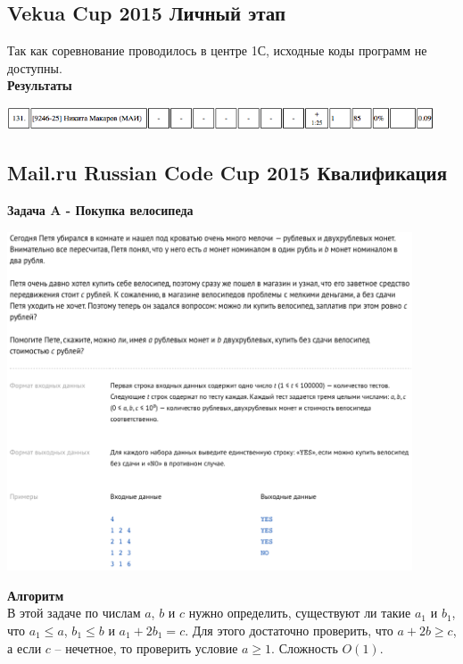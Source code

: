 \documentclass[a4paper,12pt]{article}
\begin{document}
%
%
\newpage
\subsection{Vekua Cup 2015 Личный этап}

Так как соревнование проводилось в центре 1С, исходные коды программ не доступны. \\

\textbf{{\large Результаты}} \\
\begin{center}
\includegraphics[width=0.95\textwidth]{Vekua_personal/Vekua_personal_result.png}\\ [1cm]
\end{center}


%
%

\newpage
\subsection{Mail.ru Russian Code Cup 2015 Квалификация}

\textbf{{\large Задача A - Покупка велосипеда}} \\
\begin{center}
\includegraphics[width=0.9\textwidth]{RCC/RCC_A.png}\\ [1cm]
\end{center}
\textbf{{\large Алгоритм}} \\
В этой задаче по числам $a$, $b$ и $c$ нужно определить, существуют ли такие $a_1$ и $b_1$, что $a_1 \leq a$, $b_1 \leq b$ и $a_1 + 2b_1 = c$. Для этого достаточно проверить, что $a + 2b \geq c$, а если $c$ -- нечетное, то проверить условие $a \geq 1$. Сложность $O(1)$.\\
\end{document}
